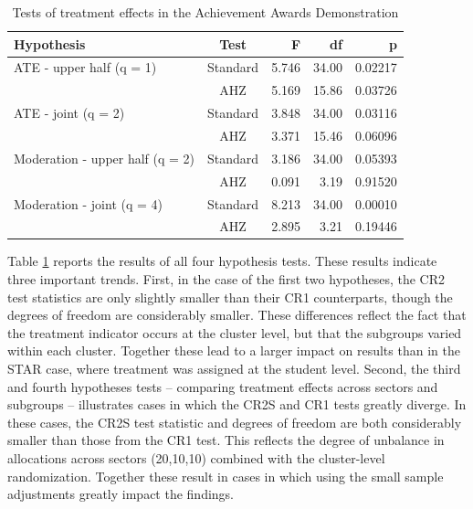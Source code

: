 \documentclass[12pt]{article}\usepackage[]{graphicx}\usepackage[]{color}
\begin{document}
\begin{table}[bth]
\centering
\begin{tabular}{lcrrr}
  \toprule
Hypothesis & Test & F & df & p \\ 
  \midrule
ATE - upper half (q = 1) & Standard & 5.746 & 34.00 & 0.02217 \\ 
   & AHZ & 5.169 & 15.86 & 0.03726 \\ 
  ATE - joint (q = 2) & Standard & 3.848 & 34.00 & 0.03116 \\ 
   & AHZ & 3.371 & 15.46 & 0.06096 \\ 
   \midrule
Moderation - upper half (q = 2) & Standard & 3.186 & 34.00 & 0.05393 \\ 
   & AHZ & 0.091 & 3.19 & 0.91520 \\ 
  Moderation - joint (q = 4) & Standard & 8.213 & 34.00 & 0.00010 \\ 
   & AHZ & 2.895 & 3.21 & 0.19446 \\ 
   \bottomrule
\end{tabular}
\caption{Tests of treatment effects in the Achievement Awards Demonstration} 
\label{tab:AAD}
\end{table}


Table \ref{tab:AAD} reports the results of all four hypothesis tests. 
These results indicate three important trends.
First, in the case of the first two hypotheses, the CR2 test statistics are only slightly smaller than their CR1 counterparts, though the degrees of freedom are considerably smaller. 
These differences reflect the fact that the treatment indicator occurs at the cluster level, but that the subgroups varied within each cluster. 
Together these lead to a larger impact on results than in the STAR case, where treatment was assigned at the student level.
Second, the third and fourth hypotheses tests -- comparing treatment effects across sectors and subgroups -- illustrates cases in which the CR2S and CR1 tests greatly diverge.
In these cases, the CR2S test statistic and degrees of freedom are both considerably smaller than those from the CR1 test. 
This reflects the degree of unbalance in allocations across sectors (20,10,10) combined with the cluster-level randomization. 
Together these result in cases in which using the small sample adjustments greatly impact the findings. 
\end{document}
